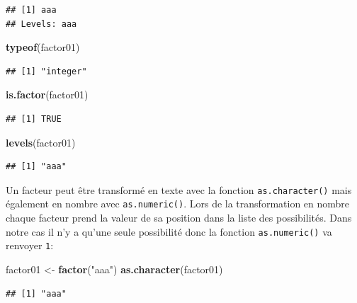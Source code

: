 \documentclass[twoside,symmetric]{book}
\newenvironment{Shaded}{}{}
\newcommand{\KeywordTok}[1]{\textbf{#1}}
\newcommand{\NormalTok}[1]{#1}
\newcommand{\StringTok}[1]{#1}
\begin{document}
\begin{verbatim}
## [1] aaa
## Levels: aaa
\end{verbatim}

\begin{Shaded}
\begin{Highlighting}[]
\KeywordTok{typeof}\NormalTok{(factor01)}
\end{Highlighting}
\end{Shaded}

\begin{verbatim}
## [1] "integer"
\end{verbatim}

\begin{Shaded}
\begin{Highlighting}[]
\KeywordTok{is.factor}\NormalTok{(factor01)}
\end{Highlighting}
\end{Shaded}

\begin{verbatim}
## [1] TRUE
\end{verbatim}

\begin{Shaded}
\begin{Highlighting}[]
\KeywordTok{levels}\NormalTok{(factor01)}
\end{Highlighting}
\end{Shaded}

\begin{verbatim}
## [1] "aaa"
\end{verbatim}

Un facteur peut être transformé en texte avec la fonction \texttt{as.character()} mais également en nombre avec \texttt{as.numeric()}. Lors de la transformation en nombre chaque facteur prend la valeur de sa position dans la liste des possibilités. Dans notre cas il n'y a qu'une seule possibilité donc la fonction \texttt{as.numeric()} va renvoyer \texttt{1}:

\begin{Shaded}
\begin{Highlighting}[]
\NormalTok{factor01 <-}\StringTok{ }\KeywordTok{factor}\NormalTok{(}\StringTok{"aaa"}\NormalTok{)}
\KeywordTok{as.character}\NormalTok{(factor01)}
\end{Highlighting}
\end{Shaded}

\begin{verbatim}
## [1] "aaa"
\end{verbatim}
\end{document}
